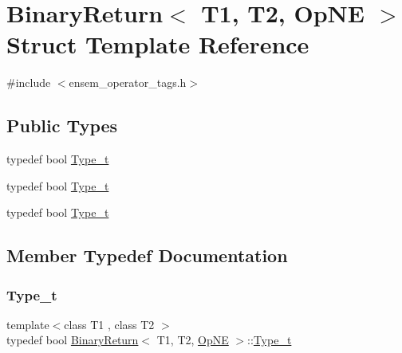 \hypertarget{structBinaryReturn_3_01T1_00_01T2_00_01OpNE_01_4}{}\section{Binary\+Return$<$ T1, T2, Op\+NE $>$ Struct Template Reference}
\label{structBinaryReturn_3_01T1_00_01T2_00_01OpNE_01_4}


{\ttfamily \#include $<$ensem\+\_\+operator\+\_\+tags.\+h$>$}

\subsection*{Public Types}
\begin{DoxyCompactItemize}
\item 
typedef bool \mbox{\hyperlink{structBinaryReturn_3_01T1_00_01T2_00_01OpNE_01_4_af07b822218544651a5f4470391645f55}{Type\+\_\+t}}
\item 
typedef bool \mbox{\hyperlink{structBinaryReturn_3_01T1_00_01T2_00_01OpNE_01_4_af07b822218544651a5f4470391645f55}{Type\+\_\+t}}
\item 
typedef bool \mbox{\hyperlink{structBinaryReturn_3_01T1_00_01T2_00_01OpNE_01_4_af07b822218544651a5f4470391645f55}{Type\+\_\+t}}
\end{DoxyCompactItemize}


\subsection{Member Typedef Documentation}
\mbox{\label{structBinaryReturn_3_01T1_00_01T2_00_01OpNE_01_4_af07b822218544651a5f4470391645f55}} 
\subsubsection{\texorpdfstring{Type\_t}{Type\_t}\hspace{0.1cm}{\footnotesize\ttfamily [1/3]}}
{\footnotesize\ttfamily template$<$class T1 , class T2 $>$ \\
typedef bool \mbox{\hyperlink{structBinaryReturn}{Binary\+Return}}$<$ T1, T2, \mbox{\hyperlink{structOpNE}{Op\+NE}} $>$\+::\mbox{\hyperlink{structBinaryReturn_3_01T1_00_01T2_00_01OpNE_01_4_af07b822218544651a5f4470391645f55}{Type\+\_\+t}}}

